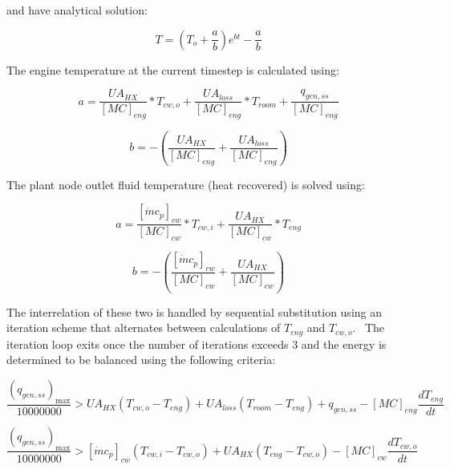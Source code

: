 and have analytical solution:

\begin{equation}
T = \left( {{T_o} + {\frac{a}{b}}} \right){e^{bt}} - {\frac{a}{b}}
\end{equation}

The engine temperature at the current timestep is calculated using:

\begin{equation}
a = \frac{{U{A_{HX}}}}{{{{[MC]}_{eng}}}}*{T_{cw,o}} + \frac{{U{A_{loss}}}}{{{{[MC]}_{eng}}}}*{T_{room}} + \frac{{{q_{gen,ss}}}}{{{{[MC]}_{eng}}}}
\end{equation}

\begin{equation}
b =  - \left( {\frac{{U{A_{HX}}}}{{{{[MC]}_{eng}}}} + \frac{{U{A_{loss}}}}{{{{[MC]}_{eng}}}}} \right)
\end{equation}

The plant node outlet fluid temperature (heat recovered) is solved using:

\begin{equation}
a = \frac{{{{[\dot m{c_p}]}_{cw}}}}{{{{[MC]}_{cw}}}}*{T_{cw,i}} + \frac{{U{A_{HX}}}}{{{{[MC]}_{cw}}}}*{T_{eng}}
\end{equation}

\begin{equation}
b =  - \left( {\frac{{{{[\dot m{c_p}]}_{cw}}}}{{{{[MC]}_{cw}}}} + \frac{{U{A_{HX}}}}{{{{[MC]}_{cw}}}}} \right)
\end{equation}

The interrelation of these two is handled by sequential substitution using an iteration scheme that alternates between calculations of \({T_{eng}}\) and \({T_{cw,o}}\).~ The iteration loop exits once the number of iterations exceeds 3 and the energy is determined to be balanced using the following criteria:

\begin{equation}
\frac{{{{\left( {{q_{gen,ss}}} \right)}_{\max }}}}{{10000000}} > U{A_{HX}}\left( {{T_{cw,o}} - {T_{eng}}} \right) + U{A_{loss}}\left( {{T_{room}} - {T_{eng}}} \right) + {q_{gen,ss}} - {[MC]_{eng}}\frac{{d{T_{eng}}}}{{dt}}
\end{equation}

\begin{equation}
\frac{{{{\left( {{q_{gen,ss}}} \right)}_{\max }}}}{{10000000}} > {[\dot m{c_p}]_{cw}}\left( {{T_{cw,i}} - {T_{cw,o}}} \right) + U{A_{HX}}\left( {{T_{eng}} - {T_{cw,o}}} \right) - {[MC]_{cw}}\frac{{d{T_{cw,o}}}}{{dt}}
\end{equation}

